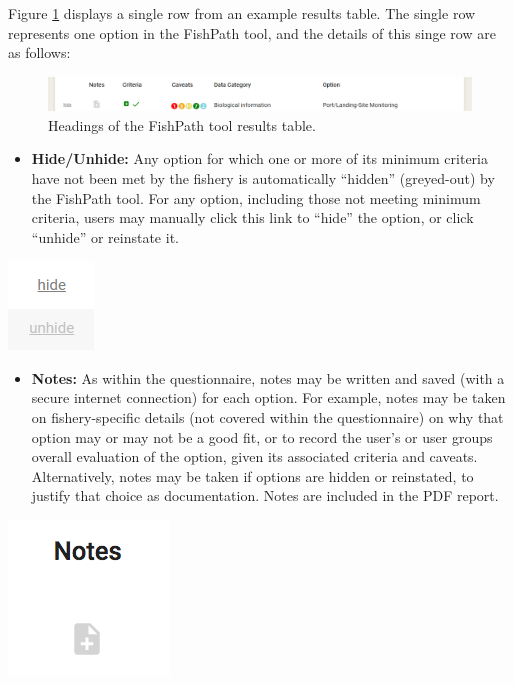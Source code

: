 \documentclass[
  11pt,
]{book}
\providecommand{\tightlist}{%
  \setlength{\itemsep}{0pt}\setlength{\parskip}{0pt}}
\begin{document}
Figure \ref{fig:single-row} displays a single row from an example results table. The single row represents one option in the FishPath tool, and the details of this singe row are as follows:

\begin{figure}

{\centering \includegraphics[width=0.95\linewidth]{images/single-row} 

}

\caption{Headings of the FishPath tool results table.}\label{fig:single-row}
\end{figure}

\begin{itemize}
\tightlist
\item
  \textbf{Hide/Unhide:} Any option for which one or more of its minimum criteria have not been met by the fishery is automatically ``hidden'' (greyed-out) by the FishPath tool. For any option, including those not meeting minimum criteria, users may manually click this link to ``hide'' the option, or click ``unhide'' or reinstate it.
\end{itemize}

\begin{center}\includegraphics[width=0.1\linewidth]{images/hide} \end{center}

\begin{itemize}
\tightlist
\item
  \textbf{Notes:} As within the questionnaire, notes may be written and saved (with a secure internet connection) for each option. For example, notes may be taken on fishery-specific details (not covered within the questionnaire) on why that option may or may not be a good fit, or to record the user's or user groups overall evaluation of the option, given its associated criteria and caveats. Alternatively, notes may be taken if options are hidden or reinstated, to justify that choice as documentation. Notes are included in the PDF report.
\end{itemize}

\begin{center}\includegraphics[width=0.15\linewidth]{images/notes} \end{center}
\end{document}

